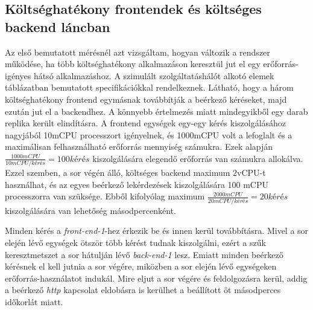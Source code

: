 \subsection{Költséghatékony frontendek és költséges backend láncban}
\label{subsec:3FE_1BE_chain}
Az első bemutatott mérésnél azt vizsgáltam, hogyan változik a rendszer működése, ha több költséghatékony alkalmazáson keresztül jut el egy erőforrás-igényes hátsó alkalmazáshoz.
A szimulált szolgáltatáshálót alkotó elemek  táblázatban bemutatott specifikációkkal rendelkeznek.
Látható, hogy a három költséghatékony frontend egymásnak továbbítják a beérkező kéréseket, majd ezután jut el a backendhez.
A könnyebb értelmezés miatt mindegyikből egy darab replika került elindításra. 
A frontend egységek egy-egy kérés kiszolgálásához nagyjából 10mCPU processzort igényelnek, és 1000mCPU volt a lefoglalt és a maximálisan felhasználható erőforrás mennyiség számukra.
Ezek alapján $\frac{1000 mCPU}{10 mCPU/kérés} = 100 kérés$ kiszolgálására elegendő erőforrás van számukra allokálva.
Ezzel szemben, a sor végén álló, költséges backend maximum 2vCPU-t használhat, és az egyes beérkező lekérdezések kiszolgálására 100 mCPU processzorra van szüksége.
Ebből kifolyólag maximum $\frac{2000 mCPU}{20 mCPU/kérés} = 20 kérés$ kiszolgálására van lehetőség másodpercenként. 

Minden kérés a \textit{front-end-1}-hez érkezik be és innen kerül továbbításra. 
Mivel a sor elején lévő egységek ötször több kérést tudnak kiszolgálni, ezért a szűk keresztmetszet a sor hátulján lévő \textit{back-end-1} lesz.
Emiatt minden beérkező kérésnek el kell jutnia a sor végére, miközben a sor elején lévő egységeken erőforrás-használatot indukál.
Mire eljut a sor végére és feldolgozásra kerül, addig a beérkező \textit{http} kapcsolat eldobásra is kerülhet a beállított öt másodperces időkorlát miatt.


